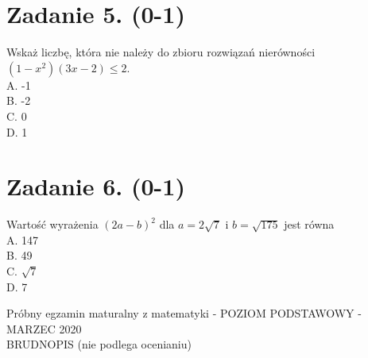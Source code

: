 \documentclass[10pt]{article}
\begin{document}
\section*{Zadanie 5. (0-1)}
Wskaż liczbę, która nie należy do zbioru rozwiązań nierówności \(\left(1-x^{2}\right)(3 x-2) \leq 2\).\\
A. -1\\
B. -2\\
C. 0\\
D. 1

\section*{Zadanie 6. (0-1)}
Wartość wyrażenia \((2 a-b)^{2}\) dla \(a=2 \sqrt{7}\) i \(b=\sqrt{175}\) jest równa\\
A. 147\\
B. 49\\
C. \(\sqrt{7}\)\\
D. 7

Próbny egzamin maturalny z matematyki - POZIOM PODSTAWOWY - MARZEC 2020\\
BRUDNOPIS (nie podlega ocenianiu)
\end{document}
